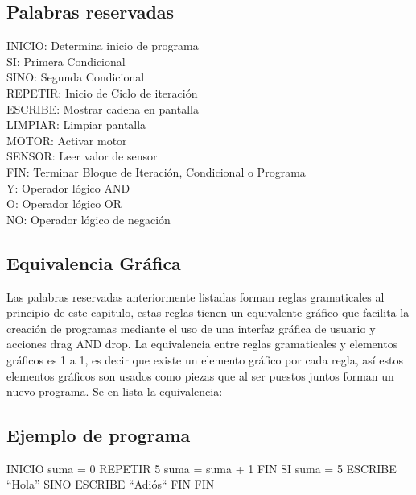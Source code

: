 \documentclass[letterpaper,10pt]{article}
\begin{document}
\subsection{Palabras reservadas}

 
INICIO: Determina inicio de programa\\
SI: Primera Condicional\\
SINO: Segunda Condicional\\
REPETIR: Inicio de Ciclo de iteración\\
ESCRIBE: Mostrar cadena en pantalla\\
LIMPIAR: Limpiar pantalla\\
MOTOR: Activar motor\\
SENSOR: Leer valor de sensor\\
FIN: Terminar Bloque de Iteración, Condicional o Programa\\
Y: Operador lógico AND\\
O: Operador lógico OR\\
NO: Operador lógico de negación\\

\subsection{Equivalencia Gráfica}


Las palabras reservadas anteriormente listadas forman reglas gramaticales al principio 
de este capitulo, estas reglas tienen un equivalente gráfico que facilita la creación 
de programas mediante el uso de una interfaz gráfica de usuario y acciones drag AND 
drop.
La equivalencia entre reglas gramaticales y elementos gráficos es 1 a 1, 
es decir que existe un elemento gráfico por cada regla,  así estos elementos 
gráficos son usados como piezas que al ser puestos juntos forman un nuevo programa. 
Se en lista la equivalencia:






\subsection{Ejemplo de programa}


INICIO\newline
	suma = 0\newline
REPETIR 5\newline
	suma = suma + 1\newline
FIN\newline
SI suma = 5\newline
	ESCRIBE ``Hola''\newline
SINO	\newline
	ESCRIBE ``Adiós``\newline
FIN\newline
FIN\newline 
\end{document}
